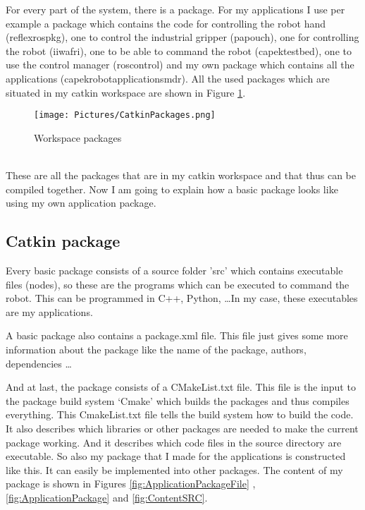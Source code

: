\documentclass[11pt,a4paper]{report}
\begin{document}
For every part of the system, there is a package. For my applications I use per example a package which contains the code for controlling the robot hand (reflex\textunderscore ros\textunderscore pkg), one to control the industrial gripper (papouch), one for controlling the robot (iiwa\textunderscore fri), one to be able to command the robot (capek\textunderscore testbed), one to use the control manager (ros\textunderscore control) and my own package which contains all the applications (capek\textunderscore robot\textunderscore applications\textunderscore mdr).
All the used packages which are situated in my catkin workspace are shown in Figure \ref{fig:CatkinPackages}.\\
\begin{figure}[!ht]
	\centering
		\texttt{[image: Pictures/CatkinPackages.png]}
		\caption{Workspace packages}
	\label{fig:CatkinPackages}
\end{figure}\\
These are all the packages that are in my catkin workspace and that thus can be compiled together. Now I am going to explain how a basic package looks like using my own application package.

\subsection{Catkin package}
Every basic package consists of a source folder 'src' which contains executable files (nodes), so these are the programs which can be executed to command the robot. This can be programmed in C++, Python, \ldots In my case, these executables are my applications.

A basic package also contains a package.xml file. This file just gives some more information about the package like the name of the package, authors, dependencies \ldots

And at last, the package consists of a CMakeList.txt file. This file is the input to the package build system ‘Cmake’ which builds the packages and thus compiles everything. This CmakeList.txt file tells the build system how to build the code. It also describes which libraries or other packages are needed to make the current package working. And it describes which code files in the source directory are executable.
So also my package that I made for the applications is constructed like this. It can easily be implemented into other packages. The content of my package is shown in Figures \ref{fig:ApplicationPackageFile} , \ref{fig:ApplicationPackage} and \ref{fig:ContentSRC}.
\end{document}
